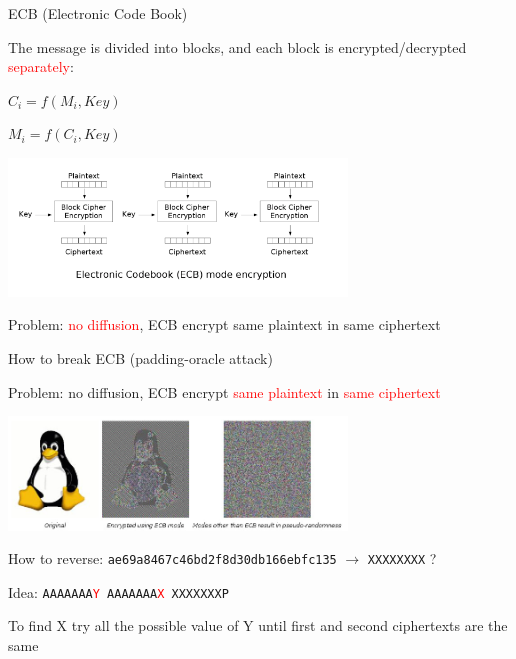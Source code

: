 \begin{frame}{ECB (Electronic Code Book)}

The message is divided into blocks, and each block is encrypted/decrypted \textcolor{red}{separately}:

\medskip

\centerline{$C_i = f(M_i, Key)$}

\centerline{$M_i = f(C_i, Key)$}

\medskip

\centerline{\includegraphics[width=9cm]{img/ECB.png}}

\medskip

Problem: \textcolor{red}{no diffusion}, ECB encrypt same plaintext in same ciphertext

\end{frame}

\begin{frame}{How to break ECB (padding-oracle attack)}

  Problem: no diffusion, ECB encrypt \textcolor{red}{same plaintext} in \textcolor{red}{same ciphertext}
  
  \medskip
  
  \centerline{\includegraphics[width=9cm]{img/tux.jpg}}

  \medskip
  
  How to reverse: \texttt{ae69a8467c46bd2f8d30db166ebfc135} $\rightarrow$ \texttt{XXXXXXXX} ?  

  \medskip

  Idea: \texttt{AAAAAAA\textcolor{red}{Y} AAAAAAA\textcolor{red}{X} XXXXXXXP}
  
  \medskip
  
  To find X try all the possible value of Y until first and second ciphertexts are the same
  
\end{frame}

